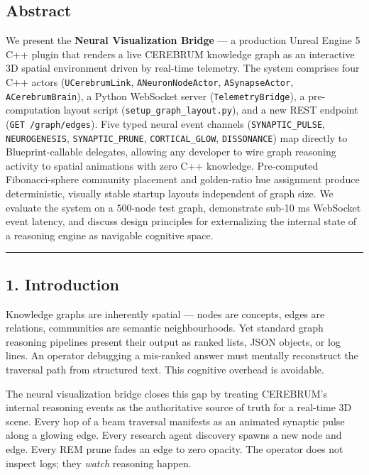 
\subsection*{Abstract}

We present the \textbf{Neural Visualization Bridge} --- a production Unreal Engine 5 C++ plugin that renders a live CEREBRUM knowledge graph as an interactive 3D spatial environment driven by real-time telemetry. The system comprises four C++ actors (\texttt{UCerebrumLink}, \texttt{ANeuronNodeActor}, \texttt{ASynapseActor}, \texttt{ACerebrumBrain}), a Python WebSocket server (\texttt{TelemetryBridge}), a pre-computation layout script (\texttt{setup\_graph\_layout.py}), and a new REST endpoint (\texttt{GET /graph/edges}). Five typed neural event channels (\texttt{SYNAPTIC\_PULSE}, \texttt{NEUROGENESIS}, \texttt{SYNAPTIC\_PRUNE}, \texttt{CORTICAL\_GLOW}, \texttt{DISSONANCE}) map directly to Blueprint-callable delegates, allowing any developer to wire graph reasoning activity to spatial animations with zero C++ knowledge. Pre-computed Fibonacci-sphere community placement and golden-ratio hue assignment produce deterministic, visually stable startup layouts independent of graph size. We evaluate the system on a 500-node test graph, demonstrate sub-10 ms WebSocket event latency, and discuss design principles for externalizing the internal state of a reasoning engine as navigable cognitive space.

\medskip\noindent\rule{\linewidth}{0.4pt}\medskip

\subsection*{1. Introduction}

Knowledge graphs are inherently spatial --- nodes are concepts, edges are relations, communities are semantic neighbourhoods. Yet standard graph reasoning pipelines present their output as ranked lists, JSON objects, or log lines. An operator debugging a mis-ranked answer must mentally reconstruct the traversal path from structured text. This cognitive overhead is avoidable.

The neural visualization bridge closes this gap by treating CEREBRUM's internal reasoning events as the authoritative source of truth for a real-time 3D scene. Every hop of a beam traversal manifests as an animated synaptic pulse along a glowing edge. Every research agent discovery spawns a new node and edge. Every REM prune fades an edge to zero opacity. The operator does not inspect logs; they \textit{watch} reasoning happen.

